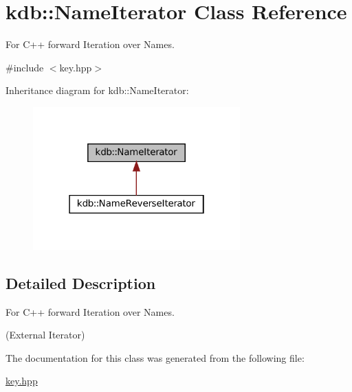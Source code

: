\hypertarget{classkdb_1_1NameIterator}{}\section{kdb\+::Name\+Iterator Class Reference}
\label{classkdb_1_1NameIterator}


For C++ forward Iteration over Names.  




{\ttfamily \#include $<$key.\+hpp$>$}



Inheritance diagram for kdb\+::Name\+Iterator\+:
\nopagebreak
\begin{figure}[H]
\begin{center}
\leavevmode
\includegraphics[width=226pt]{classkdb_1_1NameIterator__inherit__graph}
\end{center}
\end{figure}


\subsection{Detailed Description}
For C++ forward Iteration over Names. 

(External Iterator) 
\begin{DoxyCode}{0}
\DoxyCodeLine{\{}
\DoxyCodeLine{\}}
\end{DoxyCode}
 

The documentation for this class was generated from the following file\+:\begin{DoxyCompactItemize}
\item 
\mbox{\hyperlink{key_8hpp}{key.\+hpp}}\end{DoxyCompactItemize}
